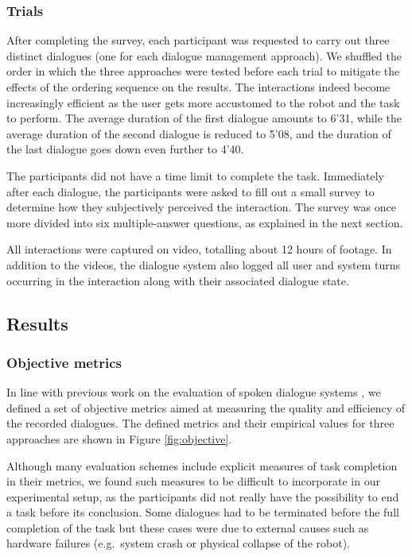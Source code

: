 \subsubsection*{Trials}

After completing the survey, each participant was requested to carry out three distinct dialogues (one for each dialogue management approach).  We shuffled the order in which the three approaches were tested before each trial to mitigate the effects of the ordering sequence on the results. The interactions indeed become increasingly efficient as the user gets more accustomed to the robot and the task to perform.  The average duration of the first dialogue amounts to 6'31, while the average duration of the second dialogue is reduced to 5'08, and the duration of the last dialogue goes down even further to 4'40.

The participants did not have a time limit to complete the task. Immediately after each dialogue, the participants were asked to fill out a small survey to determine how they subjectively perceived the interaction.  The survey was once more divided into six multiple-answer questions, as explained in the next section.

All interactions were captured on video, totalling about 12 hours of footage. In addition to the videos, the dialogue system also logged all user and system turns occurring in the interaction along with their associated dialogue state.


\subsection{Results}
\label{sec:results-exp3}

\subsubsection*{Objective metrics}
In line with previous work on the evaluation of spoken dialogue systems \citep[see e.g.][ch.~6 for an overview]{2009Jokinen}, we defined a set of objective metrics aimed at measuring the quality and efficiency of the recorded dialogues.  The defined metrics and their empirical values for three approaches are shown in Figure \ref{fig:objective}.

Although many evaluation schemes include explicit measures of task completion in their metrics, we found such measures to be difficult to incorporate in our experimental setup, as the participants did not really have the possibility to end a task before its conclusion. Some dialogues had to be terminated before the full completion of the task but these cases were due to external causes such as hardware failures (e.g.\ system crash or physical collapse of the robot).
 
